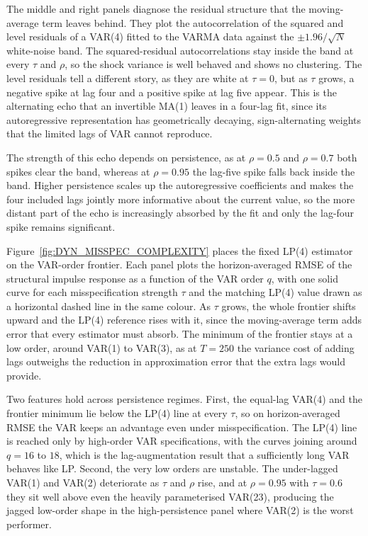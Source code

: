 The middle and right panels diagnose the residual structure that the moving-average term leaves 
behind. They plot the autocorrelation of the squared and level residuals of a VAR(4) fitted to 
the VARMA data against the $\pm 1.96/\sqrt{N}$ white-noise band. The squared-residual 
autocorrelations stay inside the band at every $\tau$ and $\rho$, so the shock variance is 
well behaved and shows no clustering. The level residuals tell a different story, as they are white 
at $\tau = 0$, but as $\tau$ grows, a negative spike at lag four and a positive spike at lag 
five appear. This is the alternating echo that an invertible MA(1) leaves in a four-lag fit, 
since its autoregressive representation has geometrically decaying, sign-alternating weights 
that the limited lags of VAR cannot reproduce. 

The strength of this echo depends on persistence, as at $\rho = 0.5$ and $\rho = 0.7$ both spikes 
clear the band, whereas at $\rho = 0.95$ the lag-five spike falls back inside the band. 
Higher persistence scales up the autoregressive 
coefficients and makes the four included lags jointly more informative about the current value, 
so the more distant part of the echo is increasingly absorbed by the fit and only the lag-four 
spike remains significant.



Figure~\ref{fig:DYN_MISSPEC_COMPLEXITY} places the fixed LP(4) estimator on the VAR-order frontier. 
Each panel plots the horizon-averaged RMSE of the structural 
impulse response as a function of the VAR order $q$, with one solid curve for each misspecification 
strength $\tau$ and the matching LP(4) value drawn as a horizontal dashed line in the same 
colour. As $\tau$ grows, the whole frontier 
shifts upward and the LP(4) reference rises with it, since the moving-average term adds error that 
every estimator must absorb. The minimum of the frontier stays at a low order, around VAR(1) to 
VAR(3), as at $T = 250$ the variance cost of adding lags outweighs the reduction in 
approximation error that the extra lags would provide.

Two features hold across persistence regimes. First, the equal-lag VAR(4) and the 
frontier minimum lie below the LP(4) line at every $\tau$, so on horizon-averaged RMSE 
the VAR keeps an advantage even under misspecification. The LP(4) line is reached only 
by high-order VAR specifications, with the curves joining around $q = 16$ to $18$, which 
is the lag-augmentation result that a sufficiently long VAR behaves like LP. Second, the 
very low orders are unstable. The under-lagged VAR(1) and VAR(2) deteriorate as 
$\tau$ and $\rho$ rise, and at $\rho = 0.95$ with $\tau = 0.6$ they sit well above even 
the heavily parameterised VAR(23), producing the jagged low-order shape in the high-persistence 
panel where VAR(2) is the worst performer.


